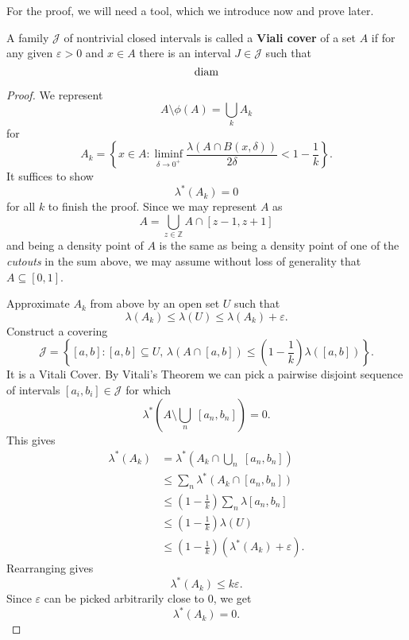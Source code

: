 For the proof, we will need a tool, which we introduce now and prove later.
\begin{definition}
    A family \(\mathcal{J} \) of nontrivial closed intervals is called a \textbf{Viali cover} of a set \( A \) if for any given \(\varepsilon > 0 \) and \( x \in A \) there is an interval \( J \in \mathcal{J} \) such that
    \[ 
       \operatorname{diam}  
   \]
\end{definition}
\begin{proof}
    We represent
    \[ 
    A \setminus \phi(A) = \bigcup_k A_k      
   \]
   for
   \[ 
       A_k = \left\{ x \in A : \liminf_{\delta \to 0^+} \frac{\lambda(A \cap B(x,\delta))}{2\delta} < 1 - \frac{1}{k} \right\}.
  \]
  It suffices to show
  \[ 
     \lambda^*(A_k) = 0 
 \]
 for all \( k \) to finish the proof. Since we may represent \( A \) as
 \[ 
     A = \bigcup_{z \in \mathbb{Z}} A \cap [z-1, z+1] 
\]
and being a density point of \( A \) is the same as being a density point of one of the \emph{cutouts} in the sum above, we may assume without loss of generality that \( A \subseteq [0,1] \).

Approximate \( A_k \) from above by an open set \( U \) such that
\[ 
    \lambda(A_k) \leqslant \lambda(U) \leqslant \lambda(A_k) + \varepsilon.
\]
Construct a covering
\[ 
    \mathcal{J} = \left\{ [a,b] : [a,b] \subseteq U,\,\lambda(A \cap [a,b]) \leqslant \left(1 - \frac{1}{k}\right)\lambda([a,b])\right\}.
\]
It is a Vitali Cover. By Vitali's Theorem we can pick a pairwise disjoint sequence of intervals \( [a_i, b_i] \in \mathcal{J}\) for which
\[ 
    \lambda^*\left( A \setminus \bigcup_n\; [a_n, b_n]\right) = 0.
\]
This gives
\begin{align*}
    \lambda^* (A_k) &=\lambda^*\left(A_k \cap \bigcup_n \; [a_n, b_n] \right) \\
                    &\leqslant \sum_n \lambda^*(A_k \cap [a_n, b_n] ) \\
                    &\leqslant \left( 1 - \frac{1}{k} \right) \sum_n\lambda[a_n, b_n] \\
                    &\leqslant \left( 1 - \frac{1}{k} \right)\lambda(U) \\
                    &\leqslant \left( 1 - \frac{1}{k} \right) \left(\lambda^*(A_k) +\varepsilon \right).
\end{align*}
Rearranging gives
\[ 
   \lambda^*(A_k) \leqslant k\varepsilon. 
\]
Since \(\varepsilon \) can be picked arbitrarily close to 0, we get
\[ 
   \lambda^*(A_k) = 0. 
\]

\end{proof}



